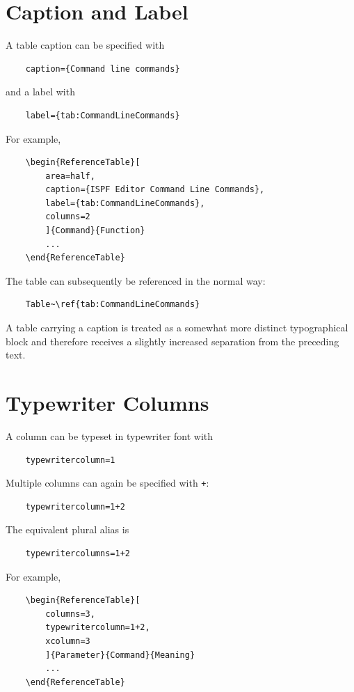 \documentclass[
11pt,
a4paper,
oneside
]{scrbook}
\begin{document}
{%
\section{Caption and Label}

A table caption can be specified with
\begin{verbatim}
	caption={Command line commands}
\end{verbatim}
and a label with
\begin{verbatim}
	label={tab:CommandLineCommands}
\end{verbatim}
For example,
\begin{verbatim}
	\begin{ReferenceTable}[
		area=half,
		caption={ISPF Editor Command Line Commands},
		label={tab:CommandLineCommands},
		columns=2
		]{Command}{Function}
		...
	\end{ReferenceTable}
\end{verbatim}
The table can subsequently be referenced in the normal way:
\begin{verbatim}
	Table~\ref{tab:CommandLineCommands}
\end{verbatim}
A table carrying a caption is treated as a somewhat more distinct
typographical block and therefore receives a slightly increased separation
from the preceding text.

\section{Typewriter Columns}

A column can be typeset in typewriter font with
\begin{verbatim}
	typewritercolumn=1
\end{verbatim}
Multiple columns can again be specified with \texttt{+}:
\begin{verbatim}
	typewritercolumn=1+2
\end{verbatim}
The equivalent plural alias is
\begin{verbatim}
	typewritercolumns=1+2
\end{verbatim}
For example,
\begin{verbatim}
	\begin{ReferenceTable}[
		columns=3,
		typewritercolumn=1+2,
		xcolumn=3
		]{Parameter}{Command}{Meaning}
		...
	\end{ReferenceTable}
\end{verbatim}


}
\end{document}
